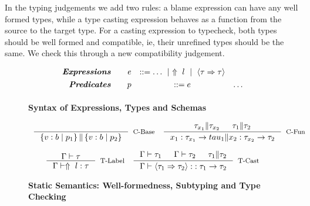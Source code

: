 In the typing judgements we add two rules:
a blame expression can have any well formed types, 
while a type casting expression behaves as a function from the 
source to the target type.
For a casting expression to typecheck, both types should be 
well formed and compatible, ie, their unrefined types should be 
the same. We check this through a new compatibility judgement.

\begin{figure}[t!]
\centering
$$
\begin{array}{rrcl}
\emphbf{Expressions} \quad 
  & e 
  & ::= \dots
  \spmid \elabel{l} 
  \spmid \ecast{\tau}{\tau} 
  \\[0.05in] 

\emphbf{Predicates} \quad 
  & p
  & ::= e
  & \dots
  \\[0.05in] 

\end{array}
$$
\caption{\textbf{Syntax of Expressions, Types and Schemas}}
\label{fig:syntax}
\end{figure}


\begin{figure}[ht!]

\medskip {}
$$\begin{array}{cc}

\inference
  {}
  {\isCompatible{\tref{b}{p_1}}{\tref{b}{p_2}}}
  [\cbase]

&

\inference
  {\isCompatible{\tau_{x_1}}{\tau_{x_2}} &&
   \isCompatible{\tau_1}{\tau_2}}
  {\isCompatible{\tfun{x_1}{\tau_{x_1}}{tau_1}}{\tfun{x_2}{\tau_{x_2}}{\tau_2}}}
  [\cfunction]
\end{array}$$



\medskip {}
$$\begin{array}{cc}

\inference
  {\isWellFormed{\Gamma}{\tau}}
  {\hastype{\Gamma}{\elabel{l}}{\tau}}
  [\tlabel]

&

\inference
  {\isWellFormed{\Gamma}{\tau_1} &&
   \isWellFormed{\Gamma}{\tau_2} && 
   \isCompatible{\tau_1}{\tau_2}}
  {\hastype{\Gamma}{\ecast{\tau_1}{\tau_2}}{\tfun{}{\tau_1}{\tau_2}}}
  [\tcast]
\end{array}$$


\caption{\textbf{Static Semantics: Well-formedness, Subtyping and Type Checking}}
\label{fig:rules}
\end{figure}




